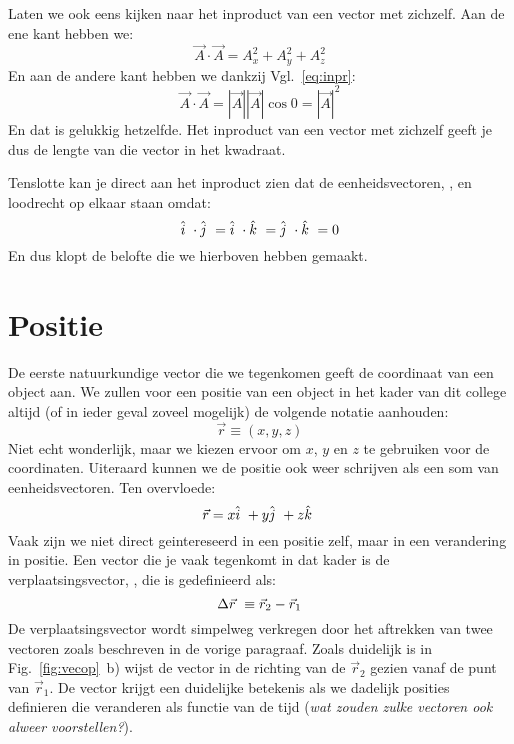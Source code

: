 Laten we ook eens kijken naar het inproduct van een vector met zichzelf. Aan de ene kant hebben we:
\begin{equation}
\vec{A}\cdot\vec{A} = A_x^2 + A_y^2 +A_z^2 
\end{equation}
En aan de andere kant hebben we dankzij Vgl.~\ref{eq:inpr}:
\begin{equation}
\vec{A}\cdot\vec{A} = |\vec{A}||\vec{A}|\cos 0 = |\vec{A}|^2
\end{equation}
En dat is gelukkig hetzelfde. Het inproduct van een vector met zichzelf geeft je dus de lengte van die vector in het kwadraat.
                                    
Tenslotte kan je direct aan het inproduct zien dat de eenheidsvectoren, \ihat, \jhat en \khat loodrecht op elkaar staan omdat:
\begin{equation}
\hat{i}~\cdot\hat{j}~=\hat{i}~\cdot\hat{k}~=\hat{j}~\cdot\hat{k}~ = 0
\end{equation}
En dus klopt de belofte die we hierboven hebben gemaakt.

\section{Positie}

De eerste natuurkundige vector die we tegenkomen geeft de coordinaat van een object aan. We zullen voor een positie van een object in het kader van dit college altijd (of in ieder geval zoveel mogelijk) de volgende notatie aanhouden:
\begin{equation}
\vec{r}  \equiv (x, y, z)
\end{equation}
Niet echt wonderlijk, maar we kiezen ervoor om $x$, $y$ en $z$ te gebruiken voor de coordinaten.
Uiteraard kunnen we de positie ook weer schrijven als een som van eenheidsvectoren. Ten overvloede:
\begin{equation}
\vec{r} = x \hat{i}~ + y \hat{j}~ + z \hat{k}~
\end{equation}
Vaak zijn we niet direct geintereseerd in een positie zelf, maar in een verandering in positie. Een vector die je vaak tegenkomt in dat kader is de verplaatsingsvector, \dr, die is gedefinieerd als:
\begin{equation}
\Delta\vec{r}~ \equiv \vec{r}_2 - \vec{r}_1
\end{equation}
De verplaatsingsvector wordt simpelweg verkregen door het aftrekken van twee vectoren zoals beschreven in de vorige paragraaf. Zoals duidelijk is in Fig.~\ref{fig:vecop}~b) wijst de vector \dr in de
richting van de $\vec{r}_2$ gezien vanaf de punt van $\vec{r}_1$. De vector \dr krijgt een duidelijke betekenis als we dadelijk posities definieren die veranderen als functie van de tijd ({\it wat zouden 
zulke vectoren ook alweer voorstellen?}).

